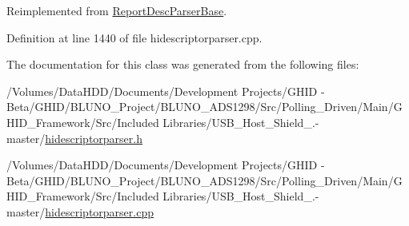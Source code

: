 \-Reimplemented from \hyperlink{class_report_desc_parser_base_ac1d6c015d9a2527bb2044e9a96fcaaf9}{\-Report\-Desc\-Parser\-Base}.



\-Definition at line 1440 of file hidescriptorparser.\-cpp.



\-The documentation for this class was generated from the following files\-:\begin{DoxyCompactItemize}
\item 
/\-Volumes/\-Data\-H\-D\-D/\-Documents/\-Development Projects/\-G\-H\-I\-D -\/ Beta/\-G\-H\-I\-D/\-B\-L\-U\-N\-O\-\_\-\-Project/\-B\-L\-U\-N\-O\-\_\-\-A\-D\-S1298/\-Src/\-Polling\-\_\-\-Driven/\-Main/\-G\-H\-I\-D\-\_\-\-Framework/\-Src/\-Included Libraries/\-U\-S\-B\-\_\-\-Host\-\_\-\-Shield\-\_.-\/master/\hyperlink{hidescriptorparser_8h}{hidescriptorparser.\-h}\item 
/\-Volumes/\-Data\-H\-D\-D/\-Documents/\-Development Projects/\-G\-H\-I\-D -\/ Beta/\-G\-H\-I\-D/\-B\-L\-U\-N\-O\-\_\-\-Project/\-B\-L\-U\-N\-O\-\_\-\-A\-D\-S1298/\-Src/\-Polling\-\_\-\-Driven/\-Main/\-G\-H\-I\-D\-\_\-\-Framework/\-Src/\-Included Libraries/\-U\-S\-B\-\_\-\-Host\-\_\-\-Shield\-\_.-\/master/\hyperlink{hidescriptorparser_8cpp}{hidescriptorparser.\-cpp}\end{DoxyCompactItemize}
